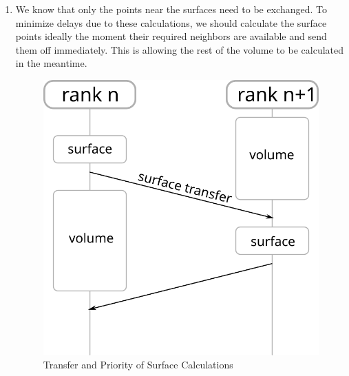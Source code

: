 \documentclass[]{scrartcl}
\begin{document}
\begin{enumerate}
    {\bfseries That means for our use case (big and nearly square grids) the 2D partitioning will always require less points to be exchanged.}

    \item We know that only the points near the surfaces need to be exchanged.
        To minimize delays due to these calculations, we should calculate the surface points ideally the moment their required neighbors are available and send them off immediately.
        This is allowing the rest of the volume to be calculated in the meantime.

    \begin{figure}[H]
        \centering
        \includegraphics[width=.4\linewidth]{img/transfer.png}
        \caption{Transfer and Priority of Surface Calculations}%
        \label{fig:transfer}
    \end{figure}
\end{enumerate}
\end{document}
